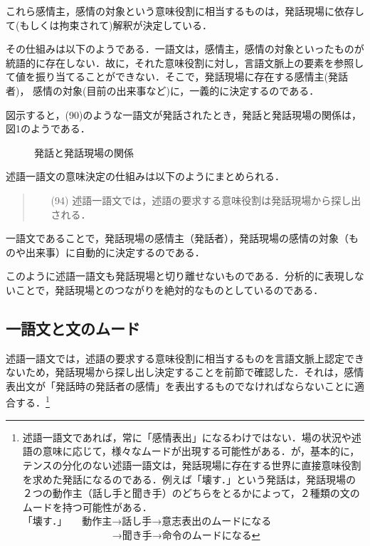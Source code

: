 これら感情主，感情の対象という意味役割に相当するものは，発話現場に依存し
て(もしくは拘束されて)解釈が決定している．

その仕組みは以下のようである．一語文は，感情主，感情の対象といったものが
統語的に存在しない．故に，それた意味役割に対し，言語文脈上の要素を参照し
て値を振り当てることができない．そこで，発話現場に存在する感情主(発話者)，
感情の対象(目前の出来事など)に，一義的に決定するのである．

図示すると，(90)のような一語文が発話されたとき，発話と発話現場の関係は，
図1のようである．

\begin{figure}[h]
\begin{center}
\caption{発話と発話現場の関係}
\end{center}
\end{figure}

述語一語文の意味決定の仕組みは以下のようにまとめられる．

\vspace{0.3cm}
\begin{quote}
\begin{itemize}
 \item[(94)] 述語一語文では，述語の要求する意味役割は発話現場から探し出される．
\end{itemize}
\end{quote}
\vspace{0.3cm}

一語文であることで，発話現場の感情主（発話者），発話現場の感情の対象（も
のや出来事）に自動的に決定するのである．

このように述語一語文も発話現場と切り離せないものである．分析的に表現しな
いことで，発話現場とのつながりを絶対的なものとしているのである．

\subsection{一語文と文のムード}

述語一語文では，述語の要求する意味役割に相当するものを言語文脈上認定でき
ないため，発話現場から探し出し決定することを前節で確認した．それは，感情
表出文が「発話時の発話者の感情」を表出するものでなければならないことに適
合する．\footnote{述語一語文であれば，常に「感情表出」になるわけではない．場の状況や述語の意味に応じて，様々なムードが出現する可能性がある．が，基本的に，テンスの分化のない述語一語文は，発話現場に存在する世界に直接意味役割を求めた発話になるのである．例えば「壊す．」という発話は，発話現場の２つの動作主（話し手と聞き手）のどちらをとるかによって，２種類の文のムードを持つ可能性がある．\\
「壊す．」　　動作主→話し手→意志表出のムードになる\\
　　　　　　　　　→聞き手→命令のムードになる}

